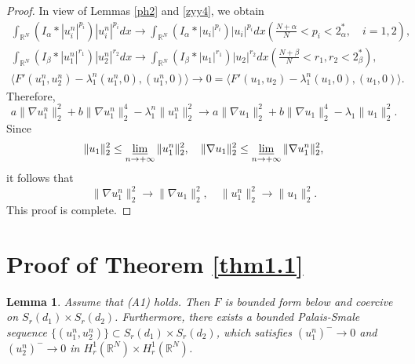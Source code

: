 \documentclass[10pt,a4paper]{amsart}
\numberwithin{equation}{section}
\newtheorem{lemma}[theo]{Lemma}
\begin{document}
\begin{proof}
In view of Lemmas \ref{ph2} and  \ref{zyy4}, we obtain
\begin{gather}\label{vbp1}
\int_{\mathbb{R}^N}(I_\alpha\ast|u_i^n|^{p_i})|u_i^n|^{p_i}dx
\to \int_{\mathbb{R}^N}(I_\alpha\ast|u_i|^{p_i})|u_i|^{p_i}dx 
(\frac{N+\alpha}{N}<p_i<2_\alpha^*,\quad  i=1,2), \\
\label{vbp2}
\int_{\mathbb{R}^N}(I_\beta\ast|u_1^n|^{r_1})|u_2^n|^{r_2}dx
\to \int_{\mathbb{R}^N}(I_\beta\ast|u_1|^{r_1})|u_2|^{r_2}dx (\frac{N+\beta}{N}
<r_1,r_2<2_\beta^*), \\
\langle F'(u_1^n,u_2^n)-\lambda_1^n(u_1^n,0),(u_1^n,0)\rangle\to 0
= \langle F'(u_1,u_2)-\lambda_1^n(u_1,0),(u_1,0)\rangle.
\end{gather}
Therefore,
\[
a\| \nabla u_1^n\|_2^2+b\| \nabla u_1^n\|_2^4-\lambda_1^n\| u_1^n\|_2^2\to
a\| \nabla u_1\|_2^2+b\| \nabla u_1\|_2^4-\lambda_1\| u_1\|_2^2.
\]
Since
\begin{equation}\label{vbp3}
 \| u_1\|_2^2\leq \varliminf_{n\to +\infty} \| u_1^n\|_2^2, \quad
 \| \nabla u_1\|_2^2\leq \varliminf_{n\to +\infty} \| \nabla u_1^n\|_2^2,
\end{equation}
it follows that
\[
 \| \nabla u_1^n\|_2^2\to \| \nabla u_1\|_2^2, \quad
 \| u_1^n\|_2^2\to \| u_1\|_2^2.
\]
This proof is complete.
\end{proof}

\section{Proof of Theorem \ref{thm1.1}} 

\begin{lemma}\label{xj5}
Assume that {\rm (A1)} holds. Then $F$ is bounded form below and coercive on 
$S_{r}(d_1)\times S_{r}(d_2)$. Furthermore, there exists a bounded
Palais-Smale sequence $\{(u_1^n,u_2^n)\}\subset S_{r}(d_1)\times S_{r}(d_2)$, 
which satisfies $(u_1^n)^-\to 0$ and
$(u_2^n)^-\to 0$ in $H_r^1(\mathbb{R}^N)\times H_r^1(\mathbb{R}^N)$.
\end{lemma}
\end{document}
